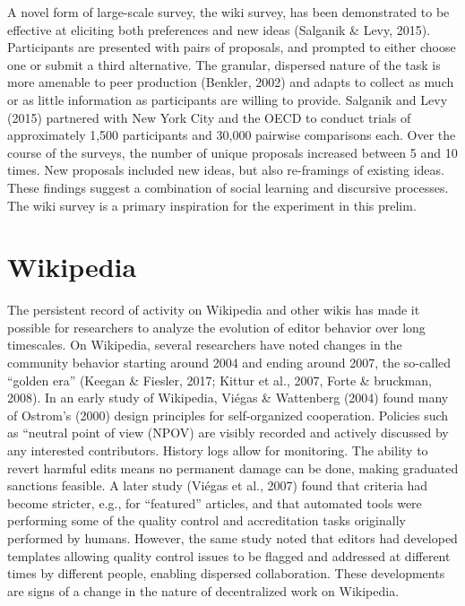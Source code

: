A novel form of large-scale survey, the wiki survey, has been demonstrated to be effective at eliciting both preferences and new ideas (Salganik \& Levy, 2015). Participants are presented with pairs of proposals, and prompted to either choose one or submit a third alternative. The granular, dispersed nature of the task is more amenable to peer production (Benkler, 2002) and adapts to collect as much or as little information as participants are willing to provide. Salganik and Levy (2015) partnered with New York City and the OECD to conduct trials of approximately 1,500 participants and 30,000 pairwise comparisons each. Over the course of the surveys, the number of unique proposals increased between 5 and 10 times. New proposals included new ideas, but also re-framings of existing ideas. These findings suggest a combination of social learning and discursive processes. The wiki survey is a primary inspiration for the experiment in this prelim.

\section{Wikipedia}
The persistent record of activity on Wikipedia and other wikis has made it possible for researchers to analyze the evolution of editor behavior over long timescales. On Wikipedia, several researchers have noted changes in the community behavior starting around 2004 and ending around 2007, the so-called ``golden era'' (Keegan \& Fiesler, 2017; Kittur et al., 2007, Forte \& bruckman, 2008). In an early study of Wikipedia, Vi\'egas \& Wattenberg (2004) found many of Ostrom’s (2000) design principles for self-organized cooperation. Policies such as ``neutral point of view (NPOV) are visibly recorded and actively discussed by any interested contributors. History logs allow for monitoring. The ability to revert harmful edits means no permanent damage can be done, making graduated sanctions feasible. A later study (Vi\'egas et al., 2007) found that criteria had become stricter, e.g., for ``featured'' articles, and that automated tools were performing some of the quality control and accreditation tasks originally performed by humans. However, the same study noted that editors had developed templates allowing quality control issues to be flagged and addressed at different times by different people, enabling dispersed collaboration. These developments are signs of a change in the nature of decentralized work on Wikipedia.

